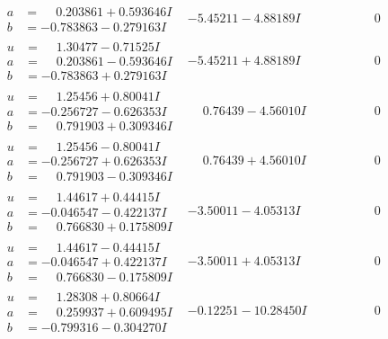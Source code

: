 \documentclass[1p]{elsarticle_modified}
\theoremstyle{definition}
\begin{document}
$$\begin{array}{c|c|c}
\begin{aligned}
a &= \phantom{-}0.203861 + 0.593646 I \\
b &= -0.783863 - 0.279163 I\end{aligned}
 & -5.45211 - 4.88189 I & \phantom{-0.000000 } 0 \\ \hline\begin{aligned}
u &= \phantom{-}1.30477 - 0.71525 I \\
a &= \phantom{-}0.203861 - 0.593646 I \\
b &= -0.783863 + 0.279163 I\end{aligned}
 & -5.45211 + 4.88189 I & \phantom{-0.000000 } 0 \\ \hline\begin{aligned}
u &= \phantom{-}1.25456 + 0.80041 I \\
a &= -0.256727 - 0.626353 I \\
b &= \phantom{-}0.791903 + 0.309346 I\end{aligned}
 & \phantom{-}0.76439 - 4.56010 I & \phantom{-0.000000 } 0 \\ \hline\begin{aligned}
u &= \phantom{-}1.25456 - 0.80041 I \\
a &= -0.256727 + 0.626353 I \\
b &= \phantom{-}0.791903 - 0.309346 I\end{aligned}
 & \phantom{-}0.76439 + 4.56010 I & \phantom{-0.000000 } 0 \\ \hline\begin{aligned}
u &= \phantom{-}1.44617 + 0.44415 I \\
a &= -0.046547 - 0.422137 I \\
b &= \phantom{-}0.766830 + 0.175809 I\end{aligned}
 & -3.50011 - 4.05313 I & \phantom{-0.000000 } 0 \\ \hline\begin{aligned}
u &= \phantom{-}1.44617 - 0.44415 I \\
a &= -0.046547 + 0.422137 I \\
b &= \phantom{-}0.766830 - 0.175809 I\end{aligned}
 & -3.50011 + 4.05313 I & \phantom{-0.000000 } 0 \\ \hline\begin{aligned}
u &= \phantom{-}1.28308 + 0.80664 I \\
a &= \phantom{-}0.259937 + 0.609495 I \\
b &= -0.799316 - 0.304270 I\end{aligned}
 & -0.12251 - 10.28450 I & \phantom{-0.000000 } 0 \\ \hline\begin{aligned}

\end{aligned}
\end{array}$$
\end{document}
